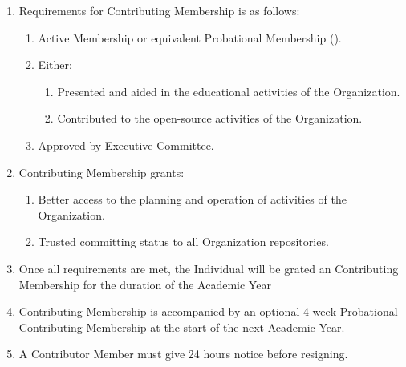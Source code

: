 \begin{enumerate}
	\item Requirements for Contributing Membership is as follows:
		\begin{enumerate}
			\item Active Membership or equivalent Probational Membership ().

			\item Either:
				\begin{enumerate}
					\item Presented and aided in the educational activities of the Organization.

					\item Contributed to the open-source activities of the Organization.
				\end{enumerate}

			\item Approved by Executive Committee.
		\end{enumerate}

	\item Contributing Membership grants:
		\begin{enumerate}
			\item Better access to the planning and operation of activities of the Organization.

			\item Trusted committing status to all Organization repositories.
		\end{enumerate}

	\item Once all requirements are met, the Individual will be grated an
		Contributing Membership for the duration of the Academic Year

	\item Contributing Membership is accompanied by an optional 4-week Probational
		Contributing Membership at the start of the next Academic Year.

	\item A Contributor Member must give 24 hours notice before resigning.
\end{enumerate}

